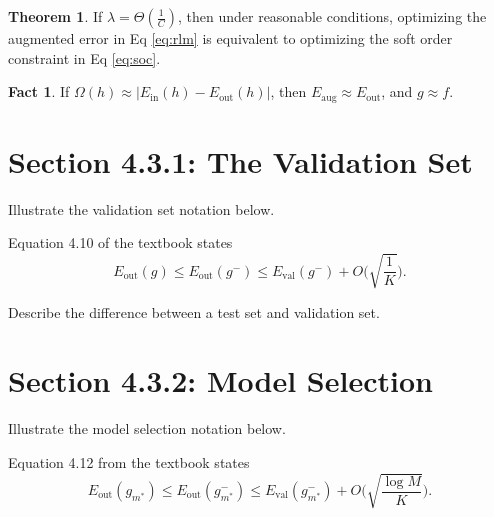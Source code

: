 \documentclass[10pt]{exam}
\theoremstyle{definition}
\newtheorem{fact}{Fact}
\newtheorem{theorem}{Theorem}
\newcommand{\Ein}{E_{\text{in}}}
\newcommand{\Eout}{E_{\text{out}}}
\newcommand{\Eval}{E_{\text{val}}}
\newcommand{\Eaug}{E_{\text{aug}}}
\newcommand{\Dtrain}{\mathcal D_{\text{train}}}
\newcommand{\Dval}{\mathcal D_{\text{val}}}
\begin{document}
\begin{theorem}
    If $\lambda = \Theta(\tfrac 1C)$, then under reasonable conditions, optimizing the augmented error in Eq \eqref{eq:rlm} is equivalent to optimizing the soft order constraint in Eq \eqref{eq:soc}.
\end{theorem}

\begin{fact}
    If $\Omega(h) \approx |\Ein(h) - \Eout(h)|$,
    then $\Eaug \approx \Eout$,
    and $g\approx f$.
\end{fact}

\newpage
\section*{Section 4.3.1: The Validation Set}


\noindent
Illustrate the validation set notation below.


\vspace{4in}
\noindent
Equation 4.10 of the textbook states
\begin{equation*}
    \Eout(g) \le \Eout(g^-) \le \Eval(g^-) + O\bigg(\sqrt{\frac 1 {K}}\bigg)
    .
\end{equation*}

\vspace{3in}
Describe the difference between a test set and validation set.

\newpage
\section*{Section 4.3.2: Model Selection}

Illustrate the model selection notation below.

\vspace{4in}

\noindent
Equation 4.12 from the textbook states 
\begin{equation*}
    \Eout(g_{m^*}) \le
    \Eout(g^{-}_{m^*}) \le \Eval(g^-_{m^*}) + O\bigg(\sqrt{\frac{\log M}{K}}\bigg).
\end{equation*}
\end{document}
